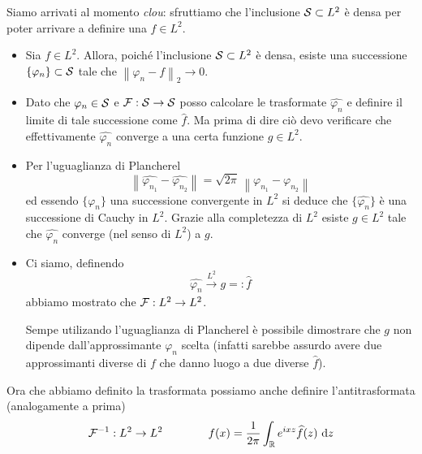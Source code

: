 \newpage

Siamo arrivati al momento \textit{clou}: sfruttiamo che l'inclusione $\mathcal{S}\subset L^2$ è densa per poter arrivare a definire una $\hat{f}\in L^2$.

\begin{itemize}
    \item Sia $f\in L^2$. Allora, poiché l'inclusione $\mathcal{S}\subset L^2$ è densa, esiste una successione $\{\varphi_n\}\subset\mathcal{S}$ tale che $\left\|\varphi_n-f\right\|_2 \to0$.

    \item Dato che $\varphi_n\in\mathcal{S}$ e $\mathcal{F}:\mathcal{S}\to\mathcal{S}$ posso calcolare le trasformate $\hat{\varphi_n}$ e definire il limite di tale successione come $\hat{f}$. Ma prima di dire ciò devo verificare che effettivamente $\hat{\varphi_n}$ converge a una certa funzione $g\in L^2$.

    \item Per l'uguaglianza di Plancherel
    \begin{equation*}
    \left\| \hat{\varphi_{n_1}}-\hat{\varphi_{n_2}}\right\|=\sqrt{2\pi}\,\left\|\varphi_{n_1}-\varphi_{n_2}\right\|
    \end{equation*}
    ed essendo $\{\varphi_n\}$ una successione convergente in $L^2$ si deduce che $\{\hat{\varphi_n}\}$ è una successione di Cauchy in $L^2$. Grazie alla completezza di $L^2$ esiste $g\in L^2$ tale che $\hat{\varphi_n}$ converge (nel senso di $L^2$) a $g$.

    \item Ci siamo, definendo
    \begin{equation*}
    \hat{\varphi_n}\xrightarrow[]{L^2}g=:\hat{f}
    \end{equation*}
    abbiamo mostrato che $\mathcal{F}:L^2\to L^2$.

    \begin{rem}
    Sempe utilizando l'uguaglianza di Plancherel è possibile dimostrare che $g$ non dipende dall'approssimante $\varphi_n$ scelta (infatti sarebbe assurdo avere due approssimanti diverse di $f$ che danno luogo a due diverse $\hat{f}$).
    \end{rem}
\end{itemize}

Ora che abbiamo definito la trasformata possiamo anche definire l'antitrasformata (analogamente a prima)
\begin{equation*}
\mathcal{F}^{-1}:L^2\to L^2\qquad \qquad f(x)=\frac{1}{2\pi}\int_{\mathbb{R}} e^{ixz}\widehat{f}(z)\  \mathrm{d} z
\end{equation*}

